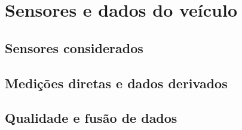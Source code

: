 \chapter{Sensores e dados do veículo}
\label{cap:sensores}

\section{Sensores considerados}


\section{Medições diretas e dados derivados}


\section{Qualidade e fusão de dados}


